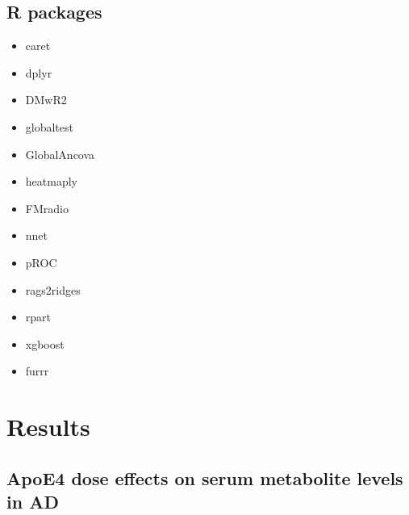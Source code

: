 \documentclass{amsart}
\begin{document}
\subsection{R packages}
\hspace{5 pt}
\begin{multicols}{3}
\begin{itemize}
    \item[] \textsf{caret} \cite{Kuhn2008BuildingPackage}
    \item[]\textsf{dplyr} \cite{dplyr}
    \item[]\textsf{DMwR2} \cite{DMwR2}
    \item[]\textsf{globaltest} \cite{Goeman2004AOutcome, Goeman2006TestingAlternative, Goeman2023ThePackage}
    \item[]\textsf{GlobalAncova} \cite{Mansmann2005TestingApproach, Hummel2008GlobalANCOVA:Effects, Hummel2023GlobalExpression}
    \item[]\textsf{heatmaply} \cite{heatmaply}
    \item[]\textsf{FMradio} \cite{Peeters2019StableData}
    \item[]\textsf{nnet} \cite{nnet}
    \item[]\textsf{pROC} \cite{pROC}
    \item[]\textsf{rags2ridges} \cite{Peeters2022Rags2ridges:Matrices}
    \item[]\textsf{rpart} \cite{rpart}
    \item[]\textsf{xgboost} \cite{Chen2016XGBoost:System}
    \item[]\textsf{furrr} \cite{furrr}
\end{itemize}
\end{multicols}

\clearpage
\section{Results}
\subsection{ApoE4 dose effects on serum metabolite levels in AD}
\end{document}
